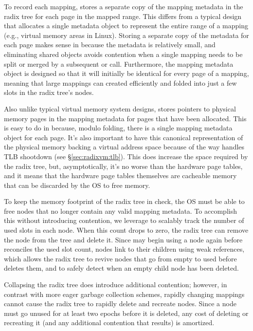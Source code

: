 To record each mapping, \vm stores a separate copy of the mapping metadata
in the radix tree for each page in the mapped range.  This differs
from a typical design that allocates a single metadata object
to represent the entire range of a mapping (e.g., virtual memory areas
in Linux).
Storing a separate copy of the metadata for each page makes sense in \vm
because the metadata is relatively small, and eliminating shared objects
avoids contention when a single mapping needs to be split or merged by
a subsequent  or  call.  Furthermore, the
mapping metadata object is designed so that it will initially be
identical for every page of a mapping, meaning that large mappings can
created efficiently and folded into just a few slots in the radix
tree's nodes.

Also unlike typical virtual memory system designs, \vm stores pointers
to physical memory pages in the mapping metadata for pages that have
been allocated.  This is easy to do in \vm because, modulo folding,
there is a single mapping metadata object for each page.  It's also
important to have this canonical representation of the physical memory
backing a virtual address space because of the way \vm handles TLB
shootdown (see \S\ref{sec:radixvm:tlb}).  This does increase the space
required by the radix tree, but, asymptotically, it's no worse than
the hardware page tables, and it means that the hardware page tables
themselves are cacheable memory that can be discarded by the OS to
free memory.

To keep the memory footprint of the radix tree in check, the OS must be
able to free nodes that no longer contain any valid mapping metadata.
To accomplish this without introducing contention, we leverage
 to scalably track the number of used slots in each node.
When this count drops to zero, the radix tree can remove the node from
the tree and delete it.  Since \vm may begin using a node again before
 reconciles the used slot count, nodes link to their children
using weak references, which allows the radix tree to revive nodes
that go from empty to used before  deletes them, and to
safely detect when an empty child node has been deleted.

Collapsing the radix tree does introduce additional contention;
however, in
contrast with more eager garbage collection schemes, rapidly changing
mappings cannot cause the radix tree to rapidly delete and recreate
nodes.  Since a node must go unused for at least two  epochs
before it is deleted, any cost of deleting or recreating it (and any
additional contention that results) is amortized.

